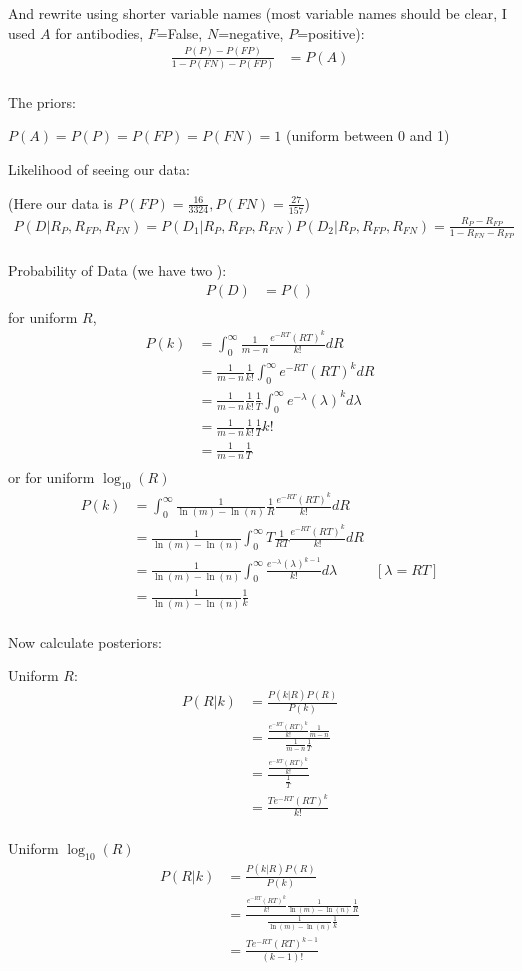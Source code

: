 And rewrite using shorter variable names (most variable names should be clear, I used $A$ for antibodies, $F$=False, $N$=negative, $P$=positive):
\begin{align*}
    \frac{P(P) - P(FP)}{1-P(FN) - P(FP)} &= P(A) \\
\end{align*}


The priors: 

$P(A) = P(P) = P(FP) = P(FN) = 1$ (uniform between 0 and 1)

Likelihood of seeing our data:

(Here our data is $P(FP) = \frac{16}{3324}, P(FN) = \frac{27}{157}$)
\begin{align*}
    P(D|R_{P}, R_{FP}, R_{FN}) = P(D_1|R_{P}, R_{FP}, R_{FN})P(D_2|R_{P}, R_{FP}, R_{FN}) = \frac{R_P - R_{FP}}{1 - R_{FN} - R_{FP}} \\
\end{align*}

Probability of Data (we have two ):
\begin{align*}
    P(D) &= P() \\
\end{align*}
for uniform $R$,
\begin{align*}
    P(k) &= \int_0^\infty \frac{1}{m-n} \frac{e^{-RT}(RT)^k}{k!} dR \\
    &= \frac{1}{m-n}\frac{1}{k!} \int_0^\infty e^{-RT}(RT)^k dR \\
    &= \frac{1}{m-n}\frac{1}{k!}\frac{1}{T} \int_0^\infty e^{-\lambda}(\lambda)^k d\lambda \\
    &= \frac{1}{m-n}\frac{1}{k!}\frac{1}{T} k! \\
    &= \frac{1}{m-n}\frac{1}{T} \\
\end{align*}
or for uniform $\log_{10}(R)$
\begin{align*}
    P(k) &= \int_0^\infty \frac{1}{\ln(m)-\ln(n)}\frac{1}{R} \frac{e^{-RT}(RT)^k}{k!} dR \\
    &= \frac{1}{\ln(m)-\ln(n)} \int_0^\infty T \frac{1}{RT} \frac{e^{-RT}(RT)^k}{k!} dR \\
    &= \frac{1}{\ln(m)-\ln(n)} \int_0^\infty \frac{e^{-\lambda}(\lambda)^{k-1}}{k!} d\lambda &[\lambda = RT]\\
    &= \frac{1}{\ln(m)-\ln(n)}\frac{1}{k} \\
\end{align*}

Now calculate posteriors:

Uniform $R$:
\begin{align*}
    P(R|k) &= \frac{P(k|R)P(R)}{P(k)}\\
    &= \frac{\frac{e^{-RT}(RT)^k}{k!}\frac{1}{m-n}}{\frac{1}{m-n}\frac{1}{T}}\\
    &= \frac{\frac{e^{-RT}(RT)^k}{k!}}{\frac{1}{T}}\\
    &= \frac{Te^{-RT}(RT)^k}{k!}\\
\end{align*}

Uniform $\log_{10}(R)$
\begin{align*}
    P(R|k) &= \frac{P(k|R)P(R)}{P(k)}\\
    &= \frac{\frac{e^{-RT}(RT)^k}{k!}\frac{1}{\ln(m)-\ln(n)} \frac{1}{R}}{\frac{1}{\ln(m)-\ln(n)}\frac{1}{k}}\\
    &= \frac{Te^{-RT}(RT)^{k-1}}{(k-1)!}\\
\end{align*}